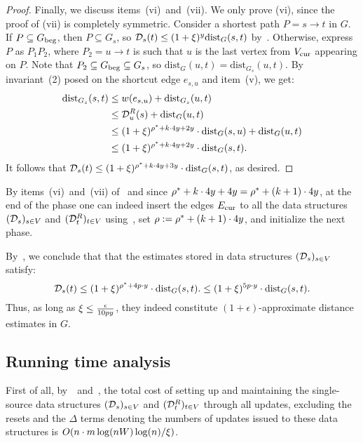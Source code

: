 \documentclass[11pt,letterpaper]{article}
\theoremstyle{plain}
\newcommand{\eps}{\ensuremath{\epsilon}}
\newcommand{\dist}{\mathrm{dist}}
\newcommand{\wei}{w}
\begin{document}
\begin{proof}
Finally, we discuss items~(vi)~and~(vii). We only prove (vi), since the proof of (vii) is completely symmetric.
Consider  a shortest path $P=s\to t$ in $G$.
If $P\subseteq G_{\mathrm{beg}}$, then $P\subseteq G_s$, so ${\dsfrom_s(t)\leq (1+\epsp)^y\dist_G(s,t)}$ by~.
Otherwise, express $P$ as $P_1P_2$, where $P_2=u\to t$ is such that $u$ is the last vertex from $V_{\mathrm{cur}}$ appearing on $P$.
Note that $P_2\subseteq G_{\mathrm{beg}}\subseteq G_s$, so $\dist_{G}(u,t)=\dist_{G_s}(u,t)$.
By invariant~(2) posed on the shortcut edge $e_{s,u}$ and item~(v), we get:
\begin{align*}
  \dist_{G_s}(s,t)&\leq \wei(e_{s,u})+\dist_{G_s}(u,t)\\
                  &\leq \dsto_u(s)+\dist_G(u,t)\\
                  &\leq (1+\epsp)^{\roff^*+k\cdot 4y+2y}\cdot \dist_G(s,u)+\dist_G(u,t)\\
                  &\leq (1+\epsp)^{\roff^*+k\cdot 4y+2y}\cdot \dist_G(s,t).
\end{align*}
It follows that $\dsfrom_s(t)\leq (1+\epsp)^{\roff^*+k\cdot 4y+3y}\cdot \dist_G(s,t)$, as desired.
\end{proof}


By items~(vi)~and~(vii) of~ and since $\rho^*+k\cdot 4y+4y=\rho^*+(k+1)\cdot 4y$, at the end of the phase one can indeed
insert the edges $E_{\mathrm{cur}}$ to all the data structures $(\mathcal{D}_s)_{s\in V}$ and $(\mathcal{D}^{R}_t)_{t\in V}$
using~, set $\rho:=\rho^*+(k+1)\cdot 4y$, and initialize the next phase.

By~, we conclude that that the estimates stored in data structures $(\mathcal{D}_s)_{s\in V}$
satisfy:
\[ \dsfrom_s(t)\leq (1+\epsp)^{\roff^*+4\reset\cdot y}\cdot \dist_G(s,t). \leq (1+\epsp)^{5\reset\cdot y}\cdot \dist_G(s,t).\]
Thus, as long as $\epsp\leq \frac{\eps}{10\reset y}$, they indeed constitute $(1+\eps)$-approximate distance estimates in $G$.

\subsection{Running time analysis}
First of all, by~~and~,
the total cost of setting up and maintaining the single-source data structures $(\mathcal{D}_s)_{s\in V}$
and $(\mathcal{D}^{R}_t)_{t\in V}$ through all updates, excluding the resets and the $\Delta$ terms denoting the numbers of updates issued to these data structures is $O(n\cdot m\log(nW)\log(n)/\xi)$. 
\end{document}
